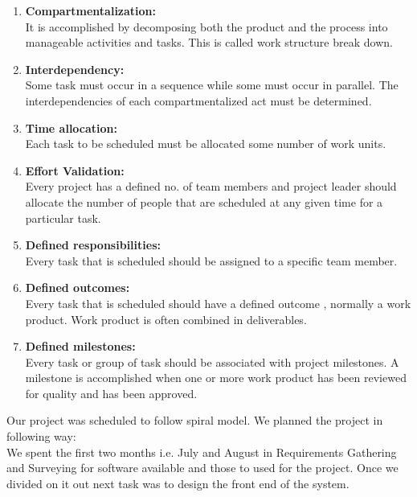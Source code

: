\begin{enumerate}
 \item \textbf{Compartmentalization:}\\\hspace*{0.82cm}It is accomplished by  decomposing both the product and the process into 
manageable activities and tasks. This is called work structure break down. 
 \item \textbf{Interdependency:}\\\hspace*{0.82cm}Some task must occur in a sequence while some must occur in parallel. The 
interdependencies of each compartmentalized act must be determined. 
 \item \textbf{Time allocation:}\\\hspace*{0.82cm}Each task to be scheduled must be allocated some number of work units. 
 \item \textbf{Effort Validation:}\\\hspace*{0.82cm}Every project has a defined no. of team members and project leader should 
allocate the number of people that are scheduled at any given time for a particular task. 
 \item \textbf{Defined responsibilities:}\\\hspace*{0.82cm}Every task  that is scheduled should be assigned to a specific team member. 
 \item \textbf{Defined outcomes:}\\\hspace*{0.82cm}Every task that is scheduled should have a defined outcome , normally a work 
product. Work product is often combined in deliverables. 
 \item \textbf{Defined milestones:}\\\hspace*{0.82cm}Every task or group of task should be associated with project milestones. A 
milestone is accomplished when one or more work product has been reviewed for quality and has been approved.
\end{enumerate}
Our project was scheduled to follow spiral model. We planned the project in following way:\\
\hspace*{0.82cm}We spent the first two months i.e. July and August in Requirements Gathering and Surveying for software available 
and those to used for the project. Once we divided on it out next task was to design the front end of the system.

